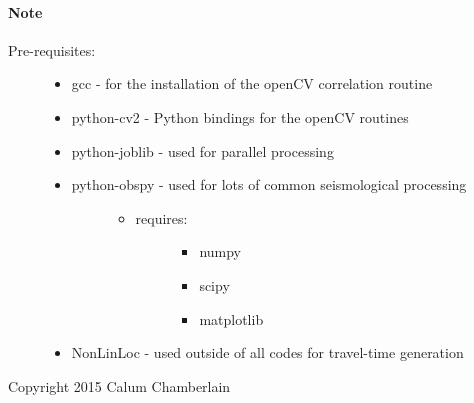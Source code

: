 \documentclass[a4paper,10pt,english]{sphinxmanual}
\begin{document}
\paragraph{Note}
\begin{description}
\item[{Pre-requisites:}] \leavevmode\begin{itemize}
\item {} 
gcc             - for the installation of the openCV correlation routine

\item {} 
python-cv2      - Python bindings for the openCV routines

\item {} 
python-joblib   - used for parallel processing

\item {} \begin{description}
\item[{python-obspy    - used for lots of common seismological processing}] \leavevmode\begin{itemize}
\item {} \begin{description}
\item[{requires:}] \leavevmode\begin{itemize}
\item {} 
numpy

\item {} 
scipy

\item {} 
matplotlib

\end{itemize}

\end{description}

\end{itemize}

\end{description}

\item {} 
NonLinLoc       - used outside of all codes for travel-time generation

\end{itemize}

\end{description}

Copyright 2015 Calum Chamberlain
\end{document}
